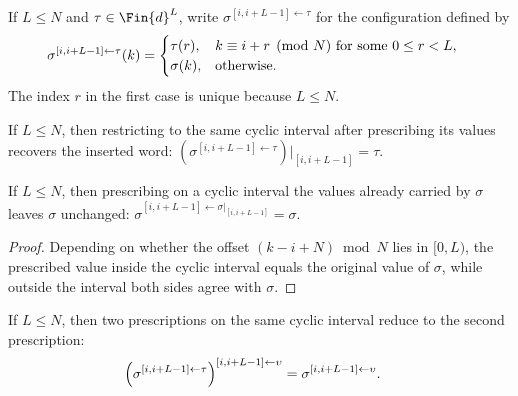\begin{definition}\label{def:replace_window}
    \leanok
    If $L\le N$ and $\tau\in\Fin{d}^{L}$, write
    $\sigma^{[i,i+L-1]\leftarrow\tau}$ for the configuration defined by
    \begin{align}
        \sigma^{[i,i+L-1]\leftarrow\tau}(k)
         & =
        \begin{cases}
            \tau(r),
             & k\equiv i+r\pmod N
            \text{ for some }0\le r<L, \\
            \sigma(k),
             & \text{otherwise}.
        \end{cases}
        \notag
    \end{align}
    The index $r$ in the first case is unique because $L\le N$.
\end{definition}

\begin{lemma}\label{lem:extract_window_replace_window}
    \leanok
    If $L\le N$, then restricting to the same cyclic interval after prescribing
    its values recovers the inserted word:
    $\left(\sigma^{[i,i+L-1]\leftarrow\tau}\right)|_{[i,i+L-1]}=\tau$.
\end{lemma}

\begin{lemma}\label{lem:replace_window_extract_window}
    \leanok
    If $L\le N$, then prescribing on a cyclic interval the values already
    carried by $\sigma$ leaves $\sigma$ unchanged:
    $\sigma^{[i,i+L-1]\leftarrow\sigma|_{[i,i+L-1]}}=\sigma$.
\end{lemma}

\begin{proof}
    \leanok
    Depending on whether the offset $(k-i+N)\bmod N$ lies in $[0,L)$,
    the prescribed value inside the cyclic interval equals the original value
    of $\sigma$, while outside the interval both sides agree with $\sigma$.
\end{proof}

\begin{lemma}\label{lem:replace_window_replace_window_same}
    \leanok
    If $L\le N$, then two prescriptions on the same cyclic interval reduce to
    the second prescription:
    \begin{align}
        \left(\sigma^{[i,i+L-1]\leftarrow\tau}\right)^{[i,i+L-1]\leftarrow\upsilon}
         & =
        \sigma^{[i,i+L-1]\leftarrow\upsilon}.
        \notag
    \end{align}
\end{lemma}

